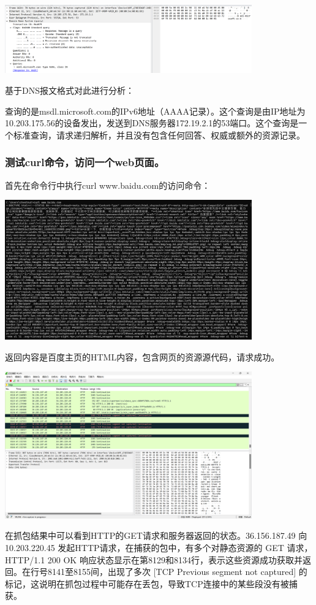 \documentclass{article}
\begin{document}
\vspace{10pt}
\centerline{\includegraphics[width=0.8\textwidth]{1_1_images/11.png}}
\vspace{10pt}

基于DNS报文格式对此进行分析：

查询的是msdl.microsoft.com的IPv6地址（AAAA记录）。这个查询是由IP地址为10.203.175.56的设备发出，发送到DNS服务器172.19.2.1的53端口。这个查询是一个标准查询，请求递归解析，并且没有包含任何回答、权威或额外的资源记录。
\subsubsection{测试curl命令，访问一个web页面。}

首先在命令行中执行curl www.baidu.com的访问命令：

\vspace{10pt}
\centerline{\includegraphics[width=0.8\textwidth]{1_1_images/12.png}}
\vspace{10pt}
返回内容是百度主页的HTML内容，包含网页的资源源代码，请求成功。

\vspace{10pt}
\centerline{\includegraphics[width=0.8\textwidth]{1_1_images/13.png}}
\vspace{10pt}
在抓包结果中可以看到HTTP的GET请求和服务器返回的状态。36.156.187.49 向 10.203.220.45 发起HTTP请求，在捕获的包中，有多个对静态资源的 GET 请求，HTTP/1.1 200 OK 响应状态显示在第8129和8134行，表示这些资源成功获取并返回。在行号8141至8155间，出现了多次 [TCP Previous segment not captured] 的标记，这说明在抓包过程中可能存在丢包，导致TCP连接中的某些段没有被捕获。
\end{document}
